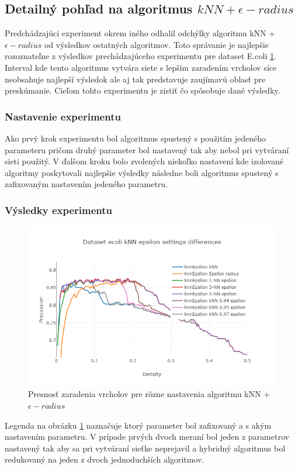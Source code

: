\documentclass[slovak,master,dept460,male,cpp,cpdeclaration]{diploma}
\begin{document}
\subsection{Detailný pohľad na algoritmus $ kNN + \epsilon-radius$}
Predchádzajúci experiment okrem iného odhalil odchýlky algoritmu kNN + $\epsilon-radius$ od výsledkov ostatných algoritmov. Toto správanie je najlepšie rozoznateľne z výsledkov prechádzajúceho experimentu pre dataset E.coli \ref{plot_ecoli_base}. Interval kde tento algoritmus vytvára siete s lepším zaradením vrcholov síce neobsahuje najlepší výsledok ale aj tak predstavuje zaujímavú oblasť pre preskúmanie. Cieľom tohto experimentu je zistiť čo spôsobuje dané výsledky.

\subsubsection{Nastavenie experimentu}
Ako prvý krok experimentu bol algoritmus spustený s použitím jedeného parameteru pričom druhý parameter bol nastavený tak aby nebol pri vytváraní sieti použitý. V ďalšom kroku bolo zvolených niekoľko nastavení kde izolované algoritmy poskytovali najlepšie výsledky následne boli algoritmus spustený s zafixovaným nastavením jedeného parametru.

\subsubsection{Výsledky experimentu}

\begin{figure}[H]
\centering
    \includegraphics[width=\textwidth]{Plots/plot_knn_epsilon_ecoli.png}
    \caption{Presnosť zaradenia vrcholov pre rôzne nastavenia algoritmu kNN + $\epsilon-radius$}
    \label{plot_ecoli_base}
\end{figure} 
Legenda na obrázku \ref{plot_ecoli_base} naznačuje ktorý parameter bol zafixovaný a s akým nastavením parametru. V prípade prvých dvoch meraní bol jeden z parametrov nastavený tak aby sa pri vytváraní sieťke neprejavil a hybridný algoritmus bol redukovaný na jeden z dvoch jednoduchších algoritmov.
\end{document}
